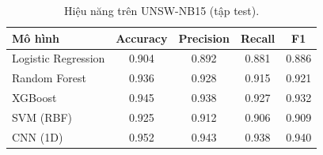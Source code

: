 \begin{table}[ht]
  \centering
  \caption{Hiệu năng trên UNSW-NB15 (tập test).}
  \label{tab:unswnb15-models}
  \begin{tabular}{l
                  S[table-format=1.3]
                  S[table-format=1.3]
                  S[table-format=1.3]
                  S[table-format=1.3]}
    \toprule
    {Mô hình} & {Accuracy} & {Precision} & {Recall} & {F1} \\
    \midrule
    Logistic Regression & 0.904 & 0.892 & 0.881 & 0.886 \\
    Random Forest       & 0.936 & 0.928 & 0.915 & 0.921 \\
    XGBoost             & 0.945 & 0.938 & 0.927 & 0.932 \\
    SVM (RBF)           & 0.925 & 0.912 & 0.906 & 0.909 \\
    CNN (1D)            & 0.952 & 0.943 & 0.938 & 0.940 \\
    \bottomrule
  \end{tabular}
\end{table}




